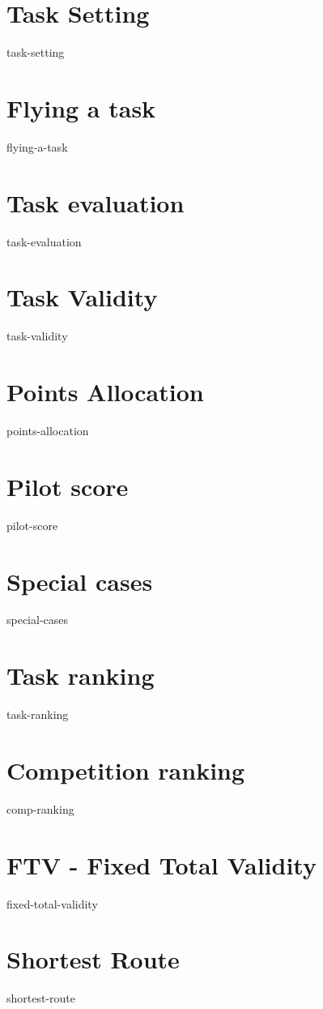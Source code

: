 \documentclass{article}
\begin{document}
\newpage
\section{Task Setting}
{task-setting}

\newpage
\section{Flying a task}
{flying-a-task}

\newpage
\section{Task evaluation}
{task-evaluation}

\newpage
\section{Task Validity}
{task-validity}

\newpage
\section{Points Allocation}
{points-allocation}

\newpage
\section{Pilot score}
{pilot-score}

\newpage
\section{Special cases}
{special-cases}

\newpage
\section{Task ranking}
{task-ranking}

\newpage
\section{Competition ranking}
{comp-ranking}

\newpage
\section{FTV - Fixed Total Validity}
{fixed-total-validity}

\newpage
\appendix
\section{Shortest Route}
{shortest-route}
\end{document}
